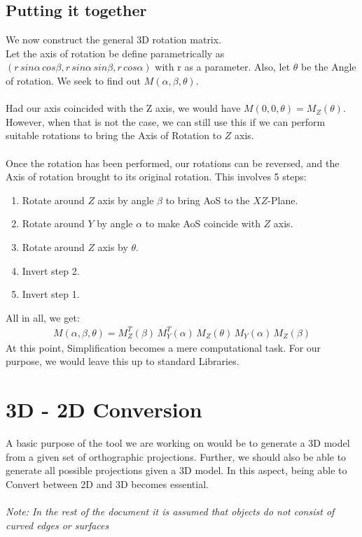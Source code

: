\documentclass[
11pt, %
english, %
singlespacing, %
headsepline, %
]{MastersDoctoralThesis} %
\begin{document}
\section{Putting it together}
We now construct the general 3D rotation matrix.\\
Let the axis of rotation be define parametrically as $ (r\, sin \alpha \, cos \beta, r\, sin \alpha \,sin \beta, r \, cos\alpha ) $ with r as a parameter. Also, let $\theta$ be the Angle of rotation. We seek to find out $M(\alpha, \beta, \theta )$. \\ \\
Had our axis coincided with the Z axis, we would have $M (0,0,\theta ) = M_Z(\theta)$. However, when that is not the case, we can still use this if we can perform suitable rotations to bring the Axis of Rotation to $Z$ axis. \\ \\
Once the rotation has been performed, our rotations can be reversed, and the Axis of rotation brought to its original rotation. This involves 5 steps:
\begin{enumerate}
\item Rotate around $Z$ axis by angle $\beta$ to bring AoS to the $XZ$-Plane.
\item Rotate around $Y$ by angle $\alpha$ to make AoS coincide with $Z$ axis.
\item Rotate around $Z$ axis by $\theta$.
\item Invert step 2.
\item Invert step 1.
\end{enumerate}
All in all, we get: \\
\begin{align*}
M(\alpha, \beta, \theta) = M_Z^T(\beta) \, M_Y^T(\alpha) \, M_Z(\theta) \, M_Y(\alpha) \, M_Z(\beta)
\end{align*}
At this point, Simplification becomes a mere computational task. For our purpose, we would leave this up to standard Libraries.






\chapter{3D - 2D Conversion}
A basic purpose of the tool we are working on would be to generate a 3D model from a given set of orthographic projections. Further, we should also be able to generate all possible projections given a 3D model. In this aspect, being able to Convert between 2D and 3D becomes essential.\\ \\
\emph{Note: In the rest of the document it is assumed that objects do not consist of curved edges or surfaces}
\end{document}
